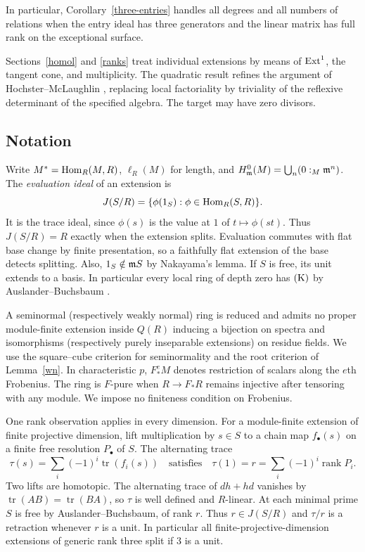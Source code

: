 In particular, Corollary~\ref{three-entries} handles all degrees and all numbers of relations when the entry ideal has three generators and the linear matrix has full rank on the exceptional surface.

Sections~\ref{homol} and \ref{ranks} treat individual extensions by means of $\operatorname{Ext}^1$, the tangent cone, and multiplicity. The quadratic result refines the argument of Hochster--McLaughlin \cite[Theorem~2.1]{HM}, replacing local factoriality by triviality of the reflexive determinant of the specified algebra. The target may have zero divisors.

\subsection*{Notation}
Write $M^*=\operatorname{Hom}_R(M,R)$, $\ell_R(M)$ for length, and
$H^0_{\mathfrak m}(M)=\bigcup_n(0:_M\mathfrak m^n)$. The \emph{evaluation ideal} of an extension is
\[
 J(S/R)=\{\phi(1_S):\phi\in\operatorname{Hom}_R(S,R)\}.
\]
It is the trace ideal, since $\phi(s)$ is the value at $1$ of $t\mapsto\phi(st)$. Thus $J(S/R)=R$ exactly when the extension splits. Evaluation commutes with flat base change by finite presentation, so a faithfully flat extension of the base detects splitting. Also, $1_S\notin\mathfrak m S$ by Nakayama's lemma. If $S$ is free, its unit extends to a basis. In particular every local ring of depth zero has $\mathrm{(K)}$ by Auslander--Buchsbaum \cite{BH}.

A seminormal (respectively weakly normal) ring is reduced and admits no proper module-finite extension inside $Q(R)$ inducing a bijection on spectra and isomorphisms (respectively purely inseparable extensions) on residue fields. We use the square--cube criterion for seminormality and the root criterion of Lemma~\ref{wn}. In characteristic $p$, $F_*^eM$ denotes restriction of scalars along the $e$th Frobenius. The ring is $F$-pure when $R\to F_*R$ remains injective after tensoring with any module. We impose no finiteness condition on Frobenius.

One rank observation applies in every dimension. For a module-finite extension of finite projective dimension, lift multiplication by $s\in S$ to a chain map $f_\bullet(s)$ on a finite free resolution $P_\bullet$ of $S$. The alternating trace
\begin{equation}\label{perfect-trace}
 \tau(s)=\sum_i(-1)^i\operatorname{tr}(f_i(s))
 \quad\text{satisfies}\quad
 \tau(1)=r=\sum_i(-1)^i\operatorname{rank}P_i .
\end{equation}
Two lifts are homotopic. The alternating trace of $dh+hd$ vanishes by $\operatorname{tr}(AB)=\operatorname{tr}(BA)$, so $\tau$ is well defined and $R$-linear. At each minimal prime $S$ is free by Auslander--Buchsbaum, of rank $r$. Thus $r\in J(S/R)$ and $\tau/r$ is a retraction whenever $r$ is a unit. In particular all finite-projective-dimension extensions of generic rank three split if $3$ is a unit.
